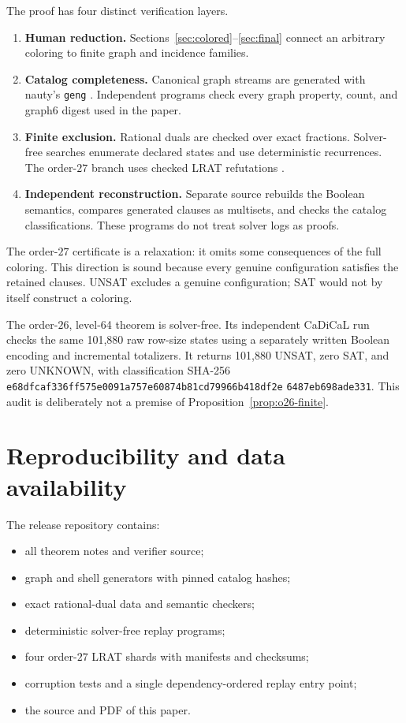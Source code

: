 \documentclass[11pt,reqno,a4paper]{amsart}
\theoremstyle{definition}
\theoremstyle{remark}
\begin{document}
The proof has four distinct verification layers.
\begin{enumerate}[label=\textup{V\arabic*.},leftmargin=3em]
\item \textbf{Human reduction.} Sections~\ref{sec:colored}--\ref{sec:final}
connect an arbitrary coloring to finite graph and incidence families.
\item \textbf{Catalog completeness.} Canonical graph streams are generated
with nauty's \texttt{geng} \cite{McKayPiperno2014}. Independent programs
check every graph property, count, and graph6 digest used in the paper.
\item \textbf{Finite exclusion.} Rational duals are checked over exact
fractions. Solver-free searches enumerate declared states and use
deterministic recurrences. The order-$27$ branch uses checked LRAT
refutations \cite{CruzFilipeEtAl2017}.
\item \textbf{Independent reconstruction.} Separate source rebuilds the
Boolean semantics, compares generated clauses as multisets, and checks
the catalog classifications. These programs do not treat solver logs as
proofs.
\end{enumerate}

The order-$27$ certificate is a relaxation: it omits some consequences of
the full coloring. This direction is sound because every genuine
configuration satisfies the retained clauses. UNSAT excludes a genuine
configuration; SAT would not by itself construct a coloring.

The order-$26$, level-64 theorem is solver-free. Its independent CaDiCaL
run checks the same 101,880 raw row-size states using a separately written
Boolean encoding and incremental totalizers. It returns 101,880 UNSAT,
zero SAT, and zero UNKNOWN, with classification SHA-256
\texttt{e68dfcaf336ff575e0091a757e60874b81cd79966b418df2e}%
\allowbreak\texttt{6487eb698ade331}.
This audit is deliberately not a premise of Proposition~\ref{prop:o26-finite}.

\section{Reproducibility and data availability}\label{sec:repro}

The release repository contains:
\begin{itemize}[leftmargin=2em]
\item all theorem notes and verifier source;
\item graph and shell generators with pinned catalog hashes;
\item exact rational-dual data and semantic checkers;
\item deterministic solver-free replay programs;
\item four order-$27$ LRAT shards with manifests and checksums;
\item corruption tests and a single dependency-ordered replay entry point;
\item the source and PDF of this paper.
\end{itemize}
\end{document}
